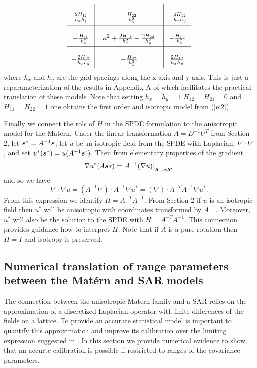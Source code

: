 \documentclass[review]{elsarticle}
\begin{document}
\begin{equation}
\label{e:3}
       \arraycolsep=6.0pt\def\arraystretch{2.5}
   \begin{array}{c|c|c}
      \frac{2H_{12}}{h_x h_y} & -\frac{H_{22}}{h_y^2} & -\frac{2H_{12}}{h_x h_y} \\
        \hline
      -\frac{H_{11}}{h_x^2} & \;\; \kappa^2 + \frac{2H_{11}}{h_x^2} + \frac{2H_{22}}{h_y^2} \;\; & -\frac{H_{11}}{h_x^2} \\
      \hline
      -\frac{2H_{12}}{h_x h_y} & -\frac{H_{22}}{h_y^2} & \frac{2H_{12}}{h_x h_y} \\
    \end{array} 
\end{equation}
where $h_x$ and $h_y$ are the grid spacings along the x-axis and y-axis. This is just a reparameterization of the results in Appendix A of \cite{lindgren2011explicit} which facilitates the practical translation of these models. Note that setting $h_x = h_y =1$  $H_{12} = H_{21} =0$ and $H_{11} = H_{22} = 1$ one obtains the first order and isotropic model from (\ref{e:2})

Finally we connect  the role of $H$ in the SPDE formulation to the anisotropic model for the Matern.   Under the linear transformation $A=D^{-1}U^T$ from Section 2,  let $\mbox{\boldmath $s$}^* =  A^{-1}  \mbox{\boldmath $s$} $, let $u$ be an isotropic field  from the SPDE with Laplacian, $\nabla \cdot \nabla$,  and  set $u^*(\mbox{\boldmath $s$}^*) = u(A^{-1} \mbox{\boldmath $s$}^*)$. 
 Then from elementary properties of the gradient 
\[ \nabla u^*( A \mbox{\boldmath $s$}*) =    \left. A^{-1} (\nabla u) \right| _{\mbox{\boldmath $s$}= A \mbox{\boldmath $s$}^*}  \]
 and so we have  
 \[ \nabla \cdot \nabla u  =  (A ^{-1}\nabla) \cdot A^{-1} \nabla u^*  =  (\nabla) \cdot A^{-T} A^{-1} \nabla u^* . \] 
 From this expression we identify $H= A^{-T}A^{-1}$.  From Section 2 if $u$ is an isotropic field then 
 $u^*$ will be anisotropic with coordinates transformed by $A^{-1}$. Moreover, $u^*$ will also be the solution to the SPDE with  $H= A^{-T}A^{-1}$. This connection provides guidance how to interpret $H$.   Note that if $A$ is a pure rotation then $H=I$ and isotropy is preserved.  

\subsection{Numerical translation of range parameters between the Mat\'ern and SAR models}
\label{ss:1}

The connection between the anisotropic Matern family and a SAR relies on the approximation of a discretized Laplacian operator with finite differences of the fields on a lattice.  To provide an accurate statistical model is important to quantify this approximation and improve its calibration over the limiting expression suggested in \cite{lindgren2011explicit}. In this section we provide numerical evidence to show that an accurte calibration is possible if restricted to ranges of the covariance parameters. 
\end{document}
